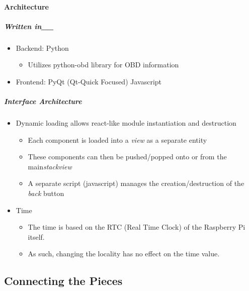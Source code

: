 \documentclass{article}
\begin{document}
\hypertarget{architecture}{%
\paragraph{Architecture}\label{architecture}}

\hypertarget{written-in__}{%
\subparagraph{Written in\_\_}\label{written-in__}}

\begin{itemize}
\item
  Backend: Python

  \begin{itemize}
  \tightlist
  \item
    Utilizes python-obd library for OBD information
  \end{itemize}
\item
  Frontend: PyQt (Qt-Quick Focused) \textbar{} Javascript
\end{itemize}

\hypertarget{interface-architecture}{%
\subparagraph{Interface Architecture}\label{interface-architecture}}

\begin{itemize}
\item
  Dynamic loading allows react-like module instantiation and destruction

  \begin{itemize}
  \item
    Each component is loaded into a \emph{view} as a separate entity
  \item
    These components can then be pushed/popped onto or from the
    main\emph{stackview}
  \item
    A separate script (javascript) manages the creation/destruction of
    the \emph{back} button
  \end{itemize}
\item
  Time

  \begin{itemize}
  \item
    The time is based on the RTC (Real Time Clock) of the Raspberry Pi
    itself.
  \item
    As such, changing the locality has no effect on the time value.
  \end{itemize}
\end{itemize}

\hypertarget{connecting-the-pieces}{%
\subsection{Connecting the Pieces}\label{connecting-the-pieces}}
\end{document}
